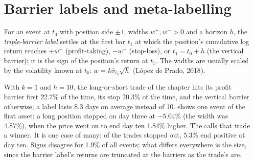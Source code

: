 \section{Barrier labels and meta-labelling}

\begin{definition}\label{def:ml:targets-labels-and-sample-weights:triple}
For an event at $t_0$ with position side $\pm1$, widths $w^+, w^- > 0$ and a horizon $h$, the \emph{triple-barrier
label} settles at the first bar $t_1$ at which the position's cumulative log return reaches
$+w^+$ (profit-taking), $-w^-$ (stop-loss), or $t_1 = t_0 + h$ (the vertical barrier); it is the sign of the position's
return at $t_1$. The widths are usually scaled by the volatility known at $t_0$: $w = k\hat\sigma_{t_0}\sqrt h$
(López de Prado, 2018).
\end{definition}

With $k = 1$ and $h = 10$, the long-or-short trade of the chapter hits its profit barrier first 22.7\% of the time, its
stop 20.3\% of the time, and the vertical barrier otherwise; a label lasts 8.3 days on average instead of 10.
 shows one event of the first asset: a long position stopped on day three at $-5.04\%$ (the
width was 4.87\%), when the price went on to end day ten 1.84\% higher. The  calls that trade a
winner. It is one case of many: of the trades stopped out, 5.3\% end positive at day ten. Signs disagree for 1.9\% of
all events; what differs everywhere is the size, since the barrier label's returns are truncated at the barriers as the
trade's are.

